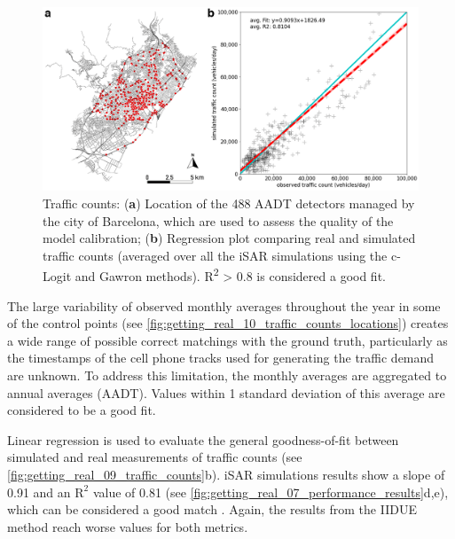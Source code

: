 \begin{figure}[htbp!]
    \centering
    \includegraphics[width=1\textwidth]{fig_09.png}
    \caption{Traffic counts: (\textbf{a}) Location of the 488 AADT detectors managed by the city of Barcelona, which are used to assess the quality of the model calibration; (\textbf{b}) Regression plot comparing real and simulated traffic counts (averaged over all the iSAR simulations using the c-Logit and Gawron methods). R\textsuperscript{2} > 0.8 is considered a good fit.}
   \label{fig:getting_real_09_traffic_counts}
\end{figure}

The large variability of observed monthly averages throughout the year in some of the control points (see \autoref{fig:getting_real_10_traffic_counts_locations}) creates a wide range of possible correct matchings with the ground truth, particularly as the timestamps of the cell phone tracks used for generating the traffic demand are unknown. To address this limitation, the monthly averages are aggregated to annual averages (AADT). Values within 1 standard deviation of this average are considered to be a good fit.

Linear regression is used to evaluate the general goodness-of-fit between simulated and real measurements of traffic counts (see \autoref{fig:getting_real_09_traffic_counts}b). iSAR simulations results show a slope of 0.91 and an $\text{R}^2$ value of 0.81 (see \autoref{fig:getting_real_07_performance_results}d,e), which can be considered a good match \citep{MinisteriodeFomento2014}. Again, the results from the IIDUE method reach worse values for both metrics.

